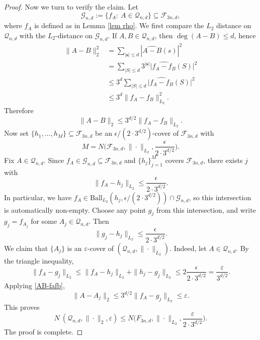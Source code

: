 \documentclass{amsbook}
\theoremstyle{definition}
\theoremstyle{remark}
\numberwithin{section}{chapter}
\numberwithin{equation}{chapter}
\newcommand{\1}{\mathbf{1}}
\newcommand{\s}{\mathbf{s}}
\begin{document}
\begin{proof}
Now we turn to verify the claim. Let
	\[
	\mathcal G_{n,d}:=\{f_A:\ A\in \mathcal Q_{n,d}\}\subseteq \mathcal F_{3n,d},
	\]
	where $f_A$ is defined as in Lemma \ref{lem rho}. We first compare the \(L_2\) distance on $\mathcal Q_{n,d}$ with the
	$L_2$-distance on $\mathcal G_{n,d}$. If $A,B\in \mathcal Q_{n,d}$, then
	$\deg(A-B)\le d$, hence
	\begin{align*}
		\|A-B\|_2^2
		&=
		\sum_{|\s|\le d} |\widehat{A-B}(s)|^2 \\
		&=
		\sum_{|S|\le d} 3^{|\s|}
		\bigl|\widehat{f_A-f_B}(S)\bigr|^2 \\
		&\le
		3^d \sum_{|S|\le d}
		\bigl|\widehat{f_A-f_B}(S)\bigr|^2 \\
		&\le
		3^d \|f_A-f_B\|_{L_2}^2.
	\end{align*}
	Therefore
	\begin{equation}\label{AB-fafb}
	\|A-B\|_2\le 3^{d/2}\|f_A-f_B\|_{L_2}.
	\end{equation}
Now set $\{h_1,\dots,h_M\}\subseteq \mathcal F_{3n,d}$ be an $\epsilon/(2\cdot 3^{d/2})$-cover of $\mathcal F_{3n,d}$ with
	\[
	M=N \big(\mathcal F_{3n,d},\|\cdot\|_{L_2},\frac{\epsilon}{2\cdot 3^{d/2}}\big).
	\]
	Fix $A \in \mathcal{Q}_{n,d}$. Since $f_A \in \mathcal{G}_{n,d}
	\subseteq \mathcal{F}_{3n,d}$ and $\{h_{j}\}_{j=1}^{M}$ covers $\mathcal{F}_{3n,d}$,
	there exists $j$ with
\[
\|f_A - h_j\|_{L_2} \le   \frac{\epsilon}{2\cdot 3^{d/2}}.
\]
In particular, we have $f_A \in \mathrm{Ball}_{L_2}(h_j,\epsilon/(2\cdot 3^{d/2})) \cap \mathcal{G}_{n,d}$, so this
	intersection is automatically non-empty. Choose any point $g_j$ from
	this intersection, and write $g_j = f_{A_j}$ for some $A_j \in
	\mathcal{Q}_{n,d}$. Then
	$$
	\|g_j - h_j\|_{L_2} \le \frac{\epsilon}{2\cdot 3^{d/2}}.
	$$
	We claim that $\{A_j\}$ is an $\varepsilon$-cover of $(\mathcal Q_{n,d},\|\cdot\|_{L_2})$. Indeed, let $A\in \mathcal Q_{n,d}$.  By the triangle inequality,
\[
	\|f_A - g_j\|_{L_2} \le \|f_A - h_j\|_{L_2} + \|h_j - g_j\|_{L_2}
	\le 2\frac{\epsilon}{2\cdot 3^{d/2}} = \frac{\varepsilon}{3^{d/2}}.
\]
	Applying \eqref{AB-fafb},
	\[
	\|A-A_j\|_2\le 3^{d/2}\|f_A-g_j\|_{L_2}\le \varepsilon.
	\]
	This proves
	\[
	N\ \left(\mathcal Q_{n,d},\|\cdot\|_2,\varepsilon\right)
	\le
	N \big(F_{3n,d},\|\cdot\|_{L_2},\frac{\varepsilon}{2\cdot 3^{d/2}}\big).
	\]
	The proof is complete.
\end{proof}

\end{document}
